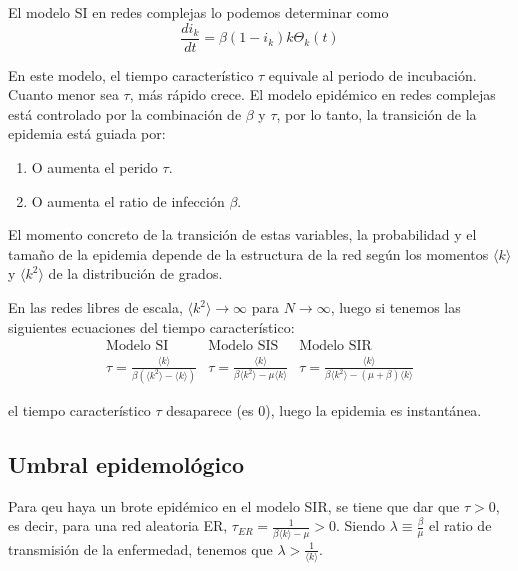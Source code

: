 \documentclass[10pt,spanish, landscape, twocolumn]{article}
\begin{document}
El modelo SI en redes complejas lo podemos determinar como $$\frac{di_k}{dt} = \beta(1-i_k)k\Theta_k(t)$$

En este modelo, el tiempo característico $\tau$ equivale al periodo de incubación. Cuanto menor sea $\tau$, más rápido crece. El modelo epidémico en redes complejas está controlado por la combinación de $\beta$ y $\tau$, por lo tanto, la transición de la epidemia está guiada por:

\begin{enumerate}[\textcolor{temasiete}{$\bullet$}]
    \item O aumenta el perido $\tau$.
    \item O aumenta el ratio de infección $\beta$.
\end{enumerate}

El momento concreto de la transición de estas variables, la probabilidad y el tamaño de la epidemia depende de la estructura de la red según los momentos $\langle k \rangle$ y $\langle k^2 \rangle$ de la distribución de grados.

En las redes libres de escala, $\langle k^2 \rangle\rightarrow\infty$ para $ N \rightarrow\infty$, luego si tenemos las siguientes ecuaciones del tiempo característico:
\begin{displaymath}
\begin{matrix}
\text{Modelo SI} & \text{Modelo SIS} & \text{Modelo SIR} \\
\tau = \frac{\langle k \rangle}{\beta(\langle k^2 \rangle - \langle k \rangle)} & \tau = \frac{\langle k \rangle}{\beta\langle k^2 \rangle - \mu\langle k \rangle} & \tau = \frac{\langle k \rangle}{\beta\langle k^2 \rangle -(\mu+\beta)\langle k \rangle}  
\end{matrix}
\end{displaymath}

el tiempo característico $\tau$ desaparece (es 0), luego la epidemia es instantánea.

\subsection{\textcolor{temasiete}Umbral epidemológico}

Para qeu haya un brote epidémico en el modelo SIR, se tiene que dar que $\tau > 0$, es decir, para una red aleatoria ER, $\tau_{ER} = \frac{1}{\beta\langle k \rangle-\mu} > 0$. 
Siendo $\lambda \equiv \frac{\beta}{\mu}$ el ratio de transmisión de la enfermedad, tenemos que $\lambda > \frac{1}{\langle k \rangle}$. 
\end{document}
